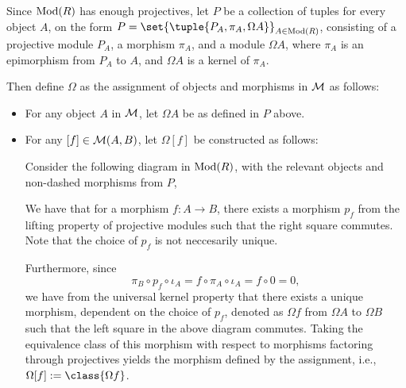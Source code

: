 \begin{definition}
    \label{def:stmod_omega}
    Since \( \operatorname{Mod}(R) \) has enough projectives, let \( P \) be a collection of tuples for every object \( A \), on the form \( P = \set{\tuple{P_A, \pi_A, \Omega A}}_{A \in \Mod(R)} \), consisting of a projective module \( P_A \), a morphism \( \pi_A \), and a module \( \Omega A \), where \( \pi_A \) is an epimorphism from \( P_A \) to \( A \), and \( \Omega A \) is a kernel of \( \pi_A \).

    Then define \( \Omega \) as the assignment of objects and morphisms in \( {\mathcal{M}} \) as follows:
    \begin{itemize}
        \item {
            For any object \( A \) in \( {\mathcal{M}} \), let \( \Omega A \) be as defined in \( P \) above.
        }
        \item {
            For any \( [f] \in {\mathcal{M}}(A, B) \), let \( \Omega [f] \) be constructed as follows:

            Consider the following diagram in \( \operatorname{Mod}(R) \), with the relevant objects and non-dashed morphisms from \( P \),
            \begin{center}
            \end{center}

            We have that for a morphism \( f: A \to B \), there exists a morphism \( p_f \) from the lifting property of projective modules such that the right square commutes. Note that the choice of \( p_f \) is not neccesarily unique.

            Furthermore, since
            \[
                \pi_B \circ p_f \circ \iota_A = f \circ \pi_A \circ \iota_A = f \circ 0 = 0,
            \]
            we have from the universal kernel property that there exists a unique morphism, dependent on the choice of \( p_f \), denoted as \( \Omega f \) from \( \Omega A \) to \( \Omega B \) such that the left square in the above diagram commutes. Taking the equivalence class of this morphism with respect to morphisms factoring through projectives yields the morphism defined by the assignment, i.e., \( \Omega [f] := \class{\Omega f} \).
        }
    \end{itemize}
\end{definition}
